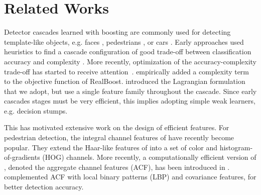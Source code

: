 \documentclass[10pt,twocolumn,letterpaper]{article}
\begin{document}
\section{Related Works}

Detector cascades learned with boosting are commonly used for detecting
template-like objects, e.g.
faces \cite{DBLP:journals/ijcv/ViolaJ04,DBLP:conf/cvpr/BourdevB05,
DBLP:conf/iccv/XiaoZZ03,DBLP:conf/iccv/XiaoZST07},
pedestrians \cite{DBLP:journals/pami/DollarABP14,
DBLP:journals/pami/SaberianV12}, or
cars \cite{DBLP:journals/jmlr/SaberianV14}. Early
approaches used heuristics to find a cascade configuration of
good trade-off between classification accuracy and
complexity \cite{DBLP:journals/ijcv/ViolaJ04,DBLP:conf/cvpr/BourdevB05,
DBLP:conf/iccv/XiaoZZ03,DBLP:conf/iccv/XiaoZST07}. More recently,
optimization of the accuracy-complexity trade-off has started to
receive attention~\cite{DBLP:conf/iccv/Masnadi-ShiraziV07,
DBLP:journals/pami/SaberianV12,DBLP:journals/jmlr/SaberianV14,
DBLP:conf/cvpr/ZhengL09}.
\cite{DBLP:conf/cvpr/ZhengL09} empirically added a complexity
term to the objective function of RealBoost.
\cite{DBLP:conf/iccv/Masnadi-ShiraziV07,
DBLP:journals/pami/SaberianV12,DBLP:journals/jmlr/SaberianV14} introduced the Lagrangian formulation that we
adopt, but use a single feature family throughout the cascade.
Since early cascades stages must be very efficient, this implies adopting
simple weak learners, e.g. decision stumps.




This has motivated extensive work on the design of efficient features.
For pedestrian detection, the integral channel features
of \cite{DBLP:conf/bmvc/DollarTPB09} have recently become popular.
They extend the Haar-like features of \cite{DBLP:journals/ijcv/ViolaJ04}
into a set of color and histogram-of-gradients (HOG) channels. More
recently, a computationally
efficient version of \cite{DBLP:journals/ijcv/ViolaJ04}, denoted the
aggregate channel features (ACF), has been introduced
in \cite{DBLP:journals/pami/DollarABP14}.
\cite{DBLP:conf/eccv/PaisitkriangkraiSH14} complemented ACF with local
binary patterns (LBP) and covariance features, for better detection accuracy.
\end{document}
